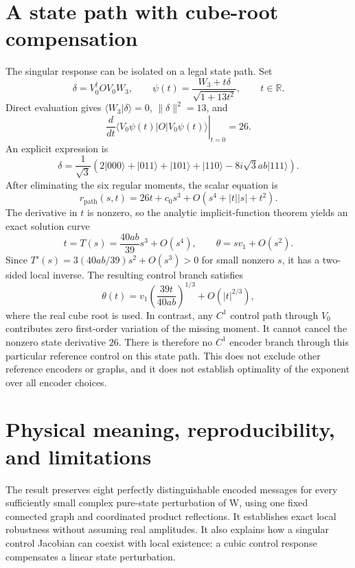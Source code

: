\documentclass[11pt]{article}
\newcommand{\ket}[1]{\lvert #1\rangle}
\newcommand{\bra}[1]{\langle #1\rvert}
\newcommand{\W}{W_3}
\begin{document}
\section{A state path with cube-root compensation}
The singular response can be isolated on a legal state path. Set
\begin{equation}
\delta=V_0^\dagger O V_0\W,\qquad
\psi(t)=\frac{\W+t\delta}{\sqrt{1+13t^2}},\qquad t\in\mathbb R.
\end{equation}
Direct evaluation gives $\bra\W\delta\rangle=0$, $\|\delta\|^2=13$, and
\begin{equation}
\left.\frac{d}{dt}\bra{V_0\psi(t)}O\ket{V_0\psi(t)}\right|_{t=0}=26.
\end{equation}
An explicit expression is
\begin{equation}
\delta=\frac1{\sqrt3}\left(2\ket{000}+\ket{011}+\ket{101}
+\ket{110}-8i\sqrt3ab\ket{111}\right).
\end{equation}
After eliminating the six regular moments, the scalar equation is
\begin{equation}
r_{\mathrm{path}}(s,t)=26t+c_0s^3+O(s^4+|t||s|+t^2).
\end{equation}
The derivative in $t$ is nonzero, so the analytic implicit-function theorem yields an exact solution curve
\begin{equation}
t=T(s)=\frac{40ab}{39}s^3+O(s^4),\qquad
\theta=s v_1+O(s^2).
\end{equation}
Since $T'(s)=3(40ab/39)s^2+O(s^3)>0$ for small nonzero $s$, it has a two-sided local inverse. The resulting control branch satisfies
\begin{equation}
\theta(t)=v_1\left(\frac{39t}{40ab}\right)^{1/3}
+O(|t|^{2/3}),
\end{equation}
where the real cube root is used. In contrast, any $C^1$ control path through $V_0$ contributes zero first-order variation of the missing moment. It cannot cancel the nonzero state derivative $26$. There is therefore no $C^1$ encoder branch through this particular reference control on this state path. This does not exclude other reference encoders or graphs, and it does not establish optimality of the exponent over all encoder choices.

\section{Physical meaning, reproducibility, and limitations}
The result preserves eight perfectly distinguishable encoded messages for every sufficiently small complex pure-state perturbation of W, using one fixed connected graph and coordinated product reflections. It establishes exact local robustness without assuming real amplitudes. It also explains how a singular control Jacobian can coexist with local existence: a cubic control response compensates a linear state perturbation.
\end{document}
